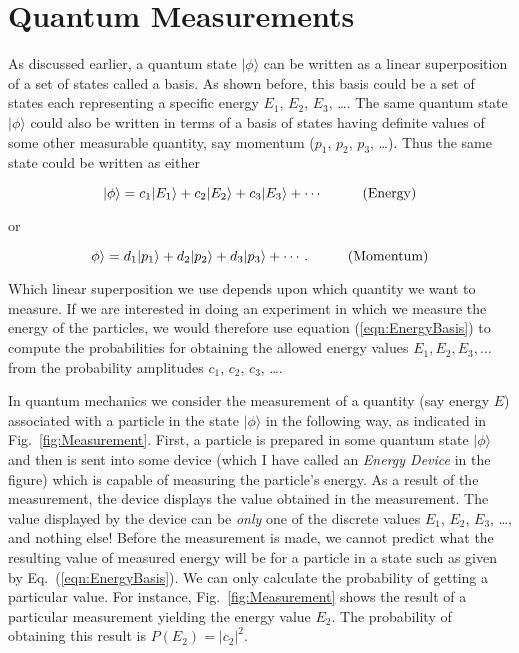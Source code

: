 \section{Quantum Measurements}
\label{sec:quantum_measurements}

As discussed earlier, a quantum state $|\mbox{$\phi$}\rangle$ can be
written as a linear superposition of a set of states called a basis.
As shown before, this basis could be a set of states each representing
a specific energy $E_1$, $E_2$, $E_3$, \ldots . The same quantum state
$|\mbox{$\phi$}\rangle$ could also be written in terms of a basis of
states having definite values of some other measurable quantity,
say momentum ($p_1$, $p_2$, $p_3$, \ldots).  Thus the same state could be
written as either

\begin{equation}
\label{eqn:EnergyBasis}
|\phi\rangle = c_1 |E_1\rangle + c_2 |E_2\rangle 
     + c_3 |E_3\rangle + \cdots  \hspace{1.0cm} \mbox{(Energy)}
\end{equation}

\noindent or

\begin{equation}
\phi\rangle = d_1 |p_1\rangle + d_2 |p_2\rangle 
  + d_3 |p_3\rangle + \cdots . \hspace{1.0cm} \mbox{(Momentum)}
\end{equation}

\noindent Which linear superposition we use depends upon which quantity
we want to measure.  If we are interested in doing an experiment in which
we measure the energy of the particles, we would therefore use equation
(\ref{eqn:EnergyBasis}) to compute the probabilities for obtaining
the allowed energy values $E_1, E_2, E_3, \ldots$ from the probability
amplitudes $c_1$, $c_2$, $c_3$, \ldots.

In quantum mechanics we consider the measurement of a quantity (say energy
$E$) associated with a particle in the state $|\mbox{$\phi$}\rangle$ in
the following way, as indicated in Fig.~\ref{fig:Measurement}.  First,
a particle is prepared in some quantum state $|\mbox{$\phi$}\rangle$ and
then is sent into some device (which I have called an {\em Energy Device}
in the figure) which is capable of measuring the particle's energy.
As a result of the measurement, the device displays the value obtained in
the measurement.  The value displayed by the device can be {\em only} one
of the discrete values $E_1$, $E_2$, $E_3$, \dots, and nothing else! Before
the measurement is made, we cannot predict what the resulting value
of measured energy will be for a particle in a state such as given by
Eq.~(\ref{eqn:EnergyBasis}). We can only calculate the probability of
getting a particular value.  For instance, Fig.~\ref{fig:Measurement}
shows the result of a particular measurement yielding the energy value
$E_2$.  The probability of obtaining this result is $P(E_2) = |c_2|^2$.


